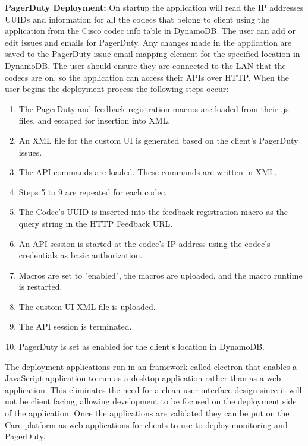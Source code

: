 \documentclass[letterpaper,12pt]{article}
\begin{document}
\textbf{PagerDuty Deployment:} On startup the application will read the IP addresses UUIDs and information for all the codecs that belong to client using the application from the Cisco codec info table in DynamoDB. The user can add or edit issues and emails for PagerDuty. Any changes made in the application are saved to the PagerDuty issue-email mapping element for the specified location in DynamoDB. The user should ensure they are connected to the LAN that the codecs are on, so the application can access their APIs over HTTP. When the user begins the deployment process the following steps occur:
\begin{enumerate}
	\item The PagerDuty and feedback registration macros are loaded from their .js files, and escaped for insertion into XML.
    \item An XML file for the custom UI is generated based on the client's PagerDuty issues.
    \item The API commands are loaded. These commands are written in XML.
    \item Steps 5 to 9 are repeated for each codec.
    \item The Codec's UUID is inserted into the feedback registration macro as the query string in the HTTP Feedback URL.
    \item An API session is started at the codec's IP address using the codec's credentials as basic authorization.
    \item Macros are set to "enabled", the macros are uploaded, and the macro runtime is restarted.
    \item The custom UI XML file is uploaded.
    \item The API session is terminated.
    \item PagerDuty is set as enabled for the client's location in DynamoDB.
\end{enumerate}

The deployment applications run in an framework called electron that enables a JavaScript application to run as a desktop application rather than as a web application. This eliminates the need for a clean user interface design since it will not be client facing, allowing development to be focused on the deployment side of the application. Once the applications are validated they can be put on the Care platform as web applications for clients to use to deploy monitoring and PagerDuty.
\end{document}
